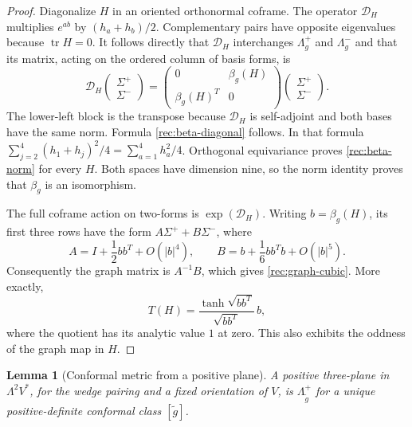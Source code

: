 \documentclass[11pt]{article}
\numberwithin{equation}{section}
\newtheorem{lemma}[theorem]{Lemma}
\theoremstyle{definition}
\theoremstyle{remark}
\begin{document}
\begin{proof}
Diagonalize $H$ in an oriented orthonormal coframe.  The operator
$\mathscr D_H$ multiplies $e^{ab}$ by $(h_a+h_b)/2$.  Complementary pairs
have opposite eigenvalues because $\operatorname{tr}H=0$.  It follows
directly that $\mathscr D_H$ interchanges $\Lambda_g^+$ and
$\Lambda_g^-$ and that its matrix, acting on the ordered column of basis
forms, is
\begin{equation}
 \mathscr D_H\begin{pmatrix}\Sigma^+\\\Sigma^-\end{pmatrix}
 =\begin{pmatrix}0&\beta_g(H)\\\beta_g(H)^T&0\end{pmatrix}
                       \begin{pmatrix}\Sigma^+\\\Sigma^-\end{pmatrix}.
 \label{rec:block-generator}
\end{equation}
The lower-left block is the transpose because $\mathscr D_H$ is
self-adjoint and both bases have the same norm.  Formula
\eqref{rec:beta-diagonal} follows.  In that formula
$\sum_{j=2}^4(h_1+h_j)^2/4=\sum_{a=1}^4h_a^2/4$.
Orthogonal equivariance proves \eqref{rec:beta-norm} for every $H$.
Both spaces have dimension nine, so the norm identity proves that
$\beta_g$ is an isomorphism.

The full coframe action on two-forms is $\exp(\mathscr D_H)$.  Writing
$b=\beta_g(H)$, its first three rows have the form
$A\Sigma^++B\Sigma^-$, where
\[
 A=I+\frac12bb^T+O(|b|^4),\qquad
 B=b+\frac16bb^Tb+O(|b|^5).
\]
Consequently the graph matrix is $A^{-1}B$, which gives
\eqref{rec:graph-cubic}.  More exactly,
\[
 T(H)=
 \frac{\tanh\sqrt{bb^T}}{\sqrt{bb^T}}\,b,
\]
where the quotient has its analytic value $1$ at zero.  This also
exhibits the oddness of the graph map in $H$.
\end{proof}

\begin{lemma}[Conformal metric from a positive plane]
\label{rec:positive-plane}
A positive three-plane in $\Lambda^2V^*$, for the wedge pairing and a
fixed orientation of $V$, is $\Lambda_{\widetilde g}^+$ for a unique
positive-definite conformal class $[\widetilde g]$.
\end{lemma}
\end{document}
